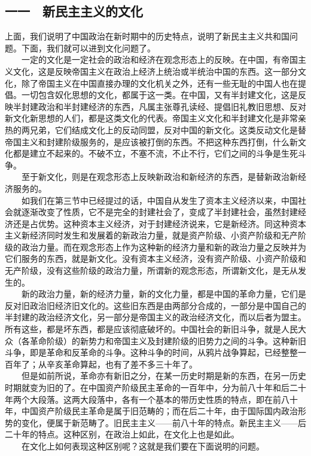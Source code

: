 \documentclass[cn,11pt,chinese]{elegantbook}
\def\myformat#1{\hfil\hfil #1}
\begin{document}
\subsection*{\myformat{一一　新民主主义的文化}}
上面，我们说明了中国政治在新时期中的历史特点，说明了新民主主义共和国问题。下面，我们就可以进到文化问题了。\\
　　一定的文化是一定社会的政治和经济在观念形态上的反映。在中国，有帝国主义文化，这是反映帝国主义在政治上经济上统治或半统治中国的东西。这一部分文化，除了帝国主义在中国直接办理的文化机关之外，还有一些无耻的中国人也在提倡。一切包含奴化思想的文化，都属于这一类。在中国，又有半封建文化，这是反映半封建政治和半封建经济的东西，凡属主张尊孔读经、提倡旧礼教旧思想、反对新文化新思想的人们，都是这类文化的代表。帝国主义文化和半封建文化是非常亲热的两兄弟，它们结成文化上的反动同盟，反对中国的新文化。这类反动文化是替帝国主义和封建阶级服务的，是应该被打倒的东西。不把这种东西打倒，什么新文化都是建立不起来的。不破不立，不塞不流，不止不行，它们之间的斗争是生死斗争。\\
　　至于新文化，则是在观念形态上反映新政治和新经济的东西，是替新政治新经济服务的。\\
　　如我们在第三节中已经提过的话，中国自从发生了资本主义经济以来，中国社会就逐渐改变了性质，它不是完全的封建社会了，变成了半封建社会，虽然封建经济还是占优势。这种资本主义经济，对于封建经济说来，它是新经济。同这种资本主义新经济同时发生和发展着的新政治力量，就是资产阶级、小资产阶级和无产阶级的政治力量。而在观念形态上作为这种新的经济力量和新的政治力量之反映并为它们服务的东西，就是新文化。没有资本主义经济，没有资产阶级、小资产阶级和无产阶级，没有这些阶级的政治力量，所谓新的观念形态，所谓新文化，是无从发生的。\\
　　新的政治力量，新的经济力量，新的文化力量，都是中国的革命力量，它们是反对旧政治旧经济旧文化的。这些旧东西是由两部分合成的，一部分是中国自己的半封建的政治经济文化，另一部分是帝国主义的政治经济文化，而以后者为盟主。所有这些，都是坏东西，都是应该彻底破坏的。中国社会的新旧斗争，就是人民大众（各革命阶级）的新势力和帝国主义及封建阶级的旧势力之间的斗争。这种新旧斗争，即是革命和反革命的斗争。这种斗争的时间，从鸦片战争算起，已经整整一百年了；从辛亥革命算起，也有了差不多三十年了。\\
　　但是如前所说，革命亦有新旧之分，在某一历史时期是新的东西，在另一历史时期就变为旧的了。在中国资产阶级民主革命的一百年中，分为前八十年和后二十年两个大段落。这两大段落中，各有一个基本的带历史性质的特点，即在前八十年，中国资产阶级民主革命是属于旧范畴的；而在后二十年，由于国际国内政治形势的变化，便属于新范畴了。旧民主主义——前八十年的特点。新民主主义——后二十年的特点。这种区别，在政治上如此，在文化上也是如此。\\
　　在文化上如何表现这种区别呢？这就是我们要在下面说明的问题。\\
\end{document}
